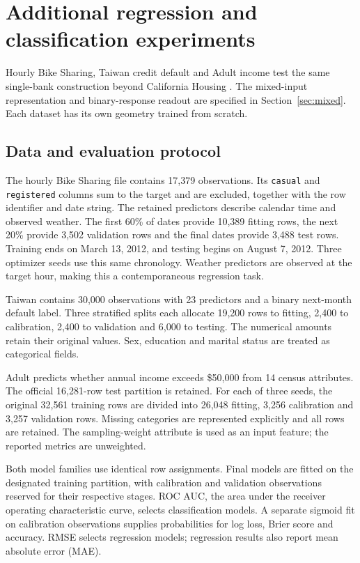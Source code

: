 \section{Additional regression and classification experiments}\label{sec:extended}

Hourly Bike Sharing, Taiwan credit default and Adult income test the same single-bank construction beyond California Housing \cite{fanaee2013data,yeh2009data,becker1996data}. The mixed-input representation and binary-response readout are specified in Section~\ref{sec:mixed}. Each dataset has its own geometry trained from scratch.

\subsection{Data and evaluation protocol}

The hourly Bike Sharing file contains 17,379 observations. Its \texttt{casual} and \texttt{registered} columns sum to the target and are excluded, together with the row identifier and date string. The retained predictors describe calendar time and observed weather. The first 60\% of dates provide 10,389 fitting rows, the next 20\% provide 3,502 validation rows and the final dates provide 3,488 test rows. Training ends on March 13, 2012, and testing begins on August 7, 2012. Three optimizer seeds use this same chronology. Weather predictors are observed at the target hour, making this a contemporaneous regression task.

Taiwan contains 30,000 observations with 23 predictors and a binary next-month default label. Three stratified splits each allocate 19,200 rows to fitting, 2,400 to calibration, 2,400 to validation and 6,000 to testing. The numerical amounts retain their original values. Sex, education and marital status are treated as categorical fields.

Adult predicts whether annual income exceeds \$50,000 from 14 census attributes. The official 16,281-row test partition is retained. For each of three seeds, the original 32,561 training rows are divided into 26,048 fitting, 3,256 calibration and 3,257 validation rows. Missing categories are represented explicitly and all rows are retained. The sampling-weight attribute is used as an input feature; the reported metrics are unweighted.

Both model families use identical row assignments. Final models are fitted on the designated training partition, with calibration and validation observations reserved for their respective stages. ROC AUC, the area under the receiver operating characteristic curve, selects classification models. A separate sigmoid fit on calibration observations supplies probabilities for log loss, Brier score and accuracy. RMSE selects regression models; regression results also report mean absolute error (MAE).

